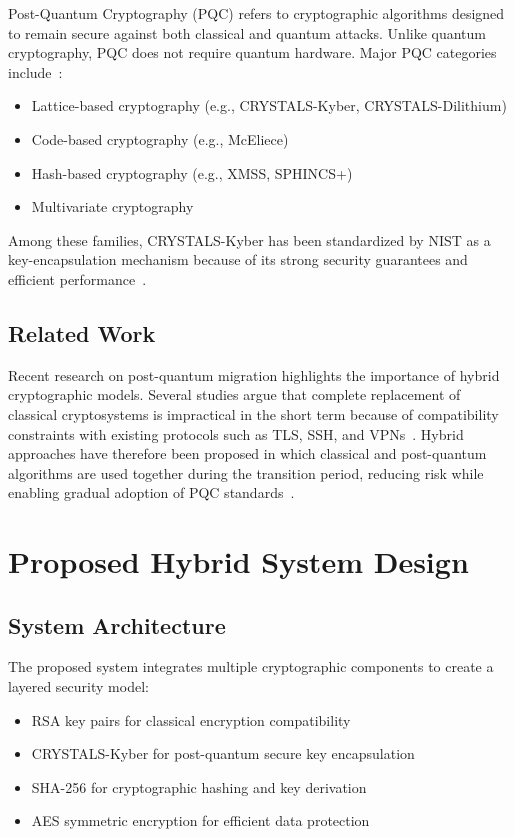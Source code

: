 \documentclass[12pt,a4paper]{article}
\begin{document}
Post-Quantum Cryptography (PQC) refers to cryptographic algorithms designed to remain secure against both classical and quantum attacks. Unlike quantum cryptography, PQC does not require quantum hardware. Major PQC categories include~\cite{bernstein2009,bernstein2017,nistir8105}:
\begin{itemize}[leftmargin=2em]
    \item Lattice-based cryptography (e.g., CRYSTALS-Kyber, CRYSTALS-Dilithium)
    \item Code-based cryptography (e.g., McEliece)
    \item Hash-based cryptography (e.g., XMSS, SPHINCS+)
    \item Multivariate cryptography
\end{itemize}

Among these families, CRYSTALS-Kyber has been standardized by NIST as a key-encapsulation mechanism because of its strong security guarantees and efficient performance~\cite{fips203,bos2018}.

\subsection{Related Work}

Recent research on post-quantum migration highlights the importance of hybrid cryptographic models. Several studies argue that complete replacement of classical cryptosystems is impractical in the short term because of compatibility constraints with existing protocols such as TLS, SSH, and VPNs~\cite{stebila2017,tls13}. Hybrid approaches have therefore been proposed in which classical and post-quantum algorithms are used together during the transition period, reducing risk while enabling gradual adoption of PQC standards~\cite{nistir8105,stebila2017}.

\section{Proposed Hybrid System Design}

\subsection{System Architecture}

The proposed system integrates multiple cryptographic components to create a layered security model:
\begin{itemize}[leftmargin=2em]
    \item RSA key pairs for classical encryption compatibility
    \item CRYSTALS-Kyber for post-quantum secure key encapsulation
    \item SHA-256 for cryptographic hashing and key derivation
    \item AES symmetric encryption for efficient data protection
\end{itemize}
\end{document}
